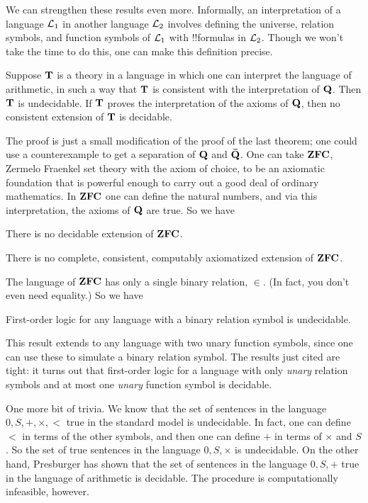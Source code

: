 \documentclass[../../include/open-logic-section]{subfiles}
\begin{document}


We can strengthen these results even more. Informally, an
interpretation of a language $\mathcal L_1$ in another language
$\mathcal L_2$ involves defining the universe, relation symbols, and
function symbols of $\mathcal L_1$ with !!{formula}s in
$\mathcal L_2$. Though we won't take the time to do this, one can make
this definition precise.

\begin{thm}
  Suppose $\mathbf{T}$ is a theory in a language in which one can
  interpret the language of arithmetic, in such a way that $\mathbf{T}$ is
  consistent with the interpretation of $\mathbf{Q}$. Then $\mathbf{T}$ is
  undecidable. If $\mathbf{T}$ proves the interpretation of the axioms of
  $\mathbf{Q}$, then no consistent extension of $\mathbf{T}$ is decidable.
\end{thm}

The proof is just a small modification of the proof of the last
theorem; one could use a counterexample to get a separation of $\mathbf{Q}$ and
$\mathbf{\bar Q}$. One can take $\mathbf{ZFC}$, Zermelo Fraenkel set theory with the
axiom of choice, to be an axiomatic foundation that is powerful enough
to carry out a good deal of ordinary mathematics. In $\mathbf{ZFC}$ one
can define the natural numbers, and via this interpretation, the
axioms of $\mathbf{Q}$ are true. So we have

\begin{cor}
There is no decidable extension of $\mathbf{ZFC}$.
\end{cor}

\begin{cor}
There is no complete, consistent, computably axiomatized extension of
$\mathbf{ZFC}$. 
\end{cor}

The language of $\mathbf{ZFC}$ has only a single binary relation,
$\in$. (In fact, you don't even need equality.) So we have

\begin{cor}
First-order logic for any language with a binary relation symbol is
undecidable.
\end{cor}

This result extends to any language with two unary function symbols,
since one can use these to simulate a binary relation symbol. The
results just cited are tight: it turns out that first-order logic for
a language with only {\em unary} relation symbols and at most one
{\em unary} function symbol is decidable.

One more bit of trivia. We know that the set of sentences in the
language $0,S,+,\times,<$ true in the standard model is
undecidable. In fact, one can define $<$ in terms of the other
symbols, and then one can define $+$ in terms of $\times$ and $S$. So
the set of true sentences in the language $0,S,\times$ is
undecidable. On the other hand, Presburger has shown that the set of
sentences in the language $0,S,+$ true in the language of arithmetic
is decidable. The procedure is computationally infeasible, however.
\end{document}
